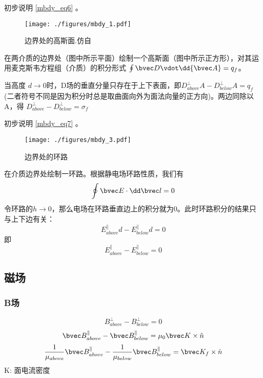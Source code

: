 \begin{example}{}
初步说明 \autoref{mbdy_eq6} 。
\begin{figure}[ht]
\centering
\texttt{[image: ./figures/mbdy\_1.pdf]}
\caption{边界处的高斯面.仿自\cite{GriffE}} \label{mbdy_fig1}
\end{figure}
在两介质的边界处（图中所示平面）绘制一个高斯面（图中所示正方形），对其运用麦克斯韦方程组（介质）的积分形式 $\oint \bvec D \vdot \dd{\bvec A} = q_f$。

当高度 $d\rightarrow0$时，D场的垂直分量只存在于上下表面，即$D^\perp_{above} A- D^\perp_{below} A= q_f$ (二者符号不同是因为积分时总是取曲面向外为面法向量的正方向)。两边同除以A，得 $D^\perp_{above} - D^\perp_{below} = \sigma_f$
\end{example}

\begin{example}{}
初步说明 \autoref{mbdy_eq7} 。
\begin{figure}[ht]
\centering
\texttt{[image: ./figures/mbdy\_3.pdf]}
\caption{边界处的环路} \label{mbdy_fig3}
\end{figure}

在介质边界处绘制一环路。根据静电场环路性质，我们有
$$ \oint \bvec E \cdot \dd \bvec l = 0$$
令环路的$h\to0$，那么电场在环路垂直边上的积分就为$0$。此时环路积分的结果只与上下边有关：
$$ E_{above}^\parallel d-E_{below}^\parallel d = 0$$
即
$$ E_{above}^\parallel-E_{below}^\parallel = 0$$

\end{example}

\subsection{磁场}

\subsubsection{B场}
\begin{equation}
B^\perp_{above} - B^\perp_{below} = 0
\end{equation}
\begin{equation}
\bvec B^\parallel_{above} - \bvec B^\parallel_{below} = \mu_0\bvec K \times \hat n 
\end{equation}
\begin{equation}\label{mbdy_eq2}
\frac{1}{\mu_{above}}\bvec B^\parallel_{above} - \frac{1}{\mu_{below}} \bvec B^\parallel_{below} = \bvec K_f \times \hat n 
\end{equation}
K: 面电流密度

